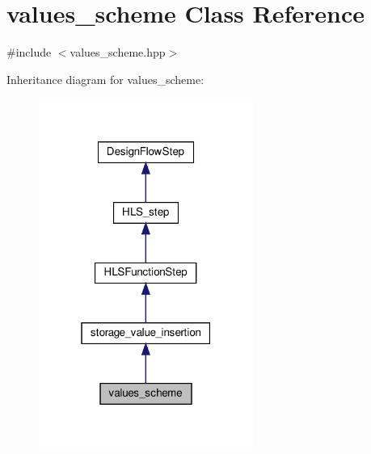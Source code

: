 \hypertarget{classvalues__scheme}{}\section{values\+\_\+scheme Class Reference}
\label{classvalues__scheme}


{\ttfamily \#include $<$values\+\_\+scheme.\+hpp$>$}



Inheritance diagram for values\+\_\+scheme\+:
\nopagebreak
\begin{figure}[H]
\begin{center}
\leavevmode
\includegraphics[width=199pt]{d3/d01/classvalues__scheme__inherit__graph}
\end{center}
\end{figure}


